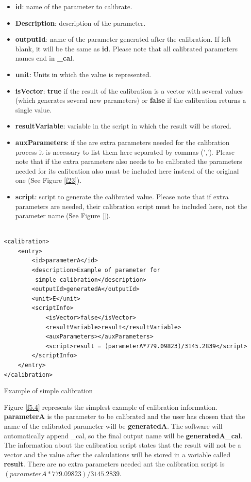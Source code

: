 \begin{itemize}
\item \textbf{id}: name of the parameter to calibrate.
\item \textbf{Description}: description of the parameter.
\item \textbf{outputId}: name of the parameter generated after the calibration. If left blank, it will be the same as \textbf{id}. Please note that all calibrated parameters names end in \textbf{\_cal}.
\item \textbf{unit}: Units in which the value is represented.
\item \textbf{isVector}: \textbf{true} if the result of the calibration is a vector with several values (which generates several new parameters) or \textbf{false} if the calibration returns a single value.
\item \textbf{resultVariable}: variable in the script in which the result will be stored.
\item \textbf{auxParameters}: if the are extra parameters needed for the calibration process it is necessary to list them here separated by commas (','). Please note that if the extra parameters also needs to be calibrated the parameters needed for its calibration also must be included here instead of the original one (See Figure \ref{f23}).
\item \textbf{script}: script to generate the calibrated value. Please note that if extra parameters are needed, their calibration script must be included here, not the parameter name (See Figure \ref{}). 
\end{itemize}



\begin{table}[H]
\lstset{language=XML}
\begin{lstlisting}

<calibration>
	<entry>
		<id>parameterA</id>
		<description>Example of parameter for
		 simple calibration</description>
		<outputId>generatedA</outputId> 
		<unit>E</unit>
		<scriptInfo>
			<isVector>false</isVector>
			<resultVariable>result</resultVariable>
			<auxParameters></auxParameters>
			<script>result = (parameterA*779.09823)/3145.2839</script>
		</scriptInfo>
	</entry>
</calibration>
\end{lstlisting}
\caption{Example of simple calibration}
\label{Table5.2}
\end{table}

Figure \ref{f5.4} represents the simplest example of calibration information. \textbf{parameterA} is the parameter to be calibrated and the user has chosen that the name of the calibrated parameter will be \textbf{generatedA}. The software will automatically append  \_cal, so the final output name will be \textbf{generatedA\_cal}. The information about the calibration script states that the result will not be a vector and the value after the calculations will be stored in a variable called \textbf{result}. There are no extra parameters needed ant the calibration script is $(parameterA*779.09823)/3145.2839$.

